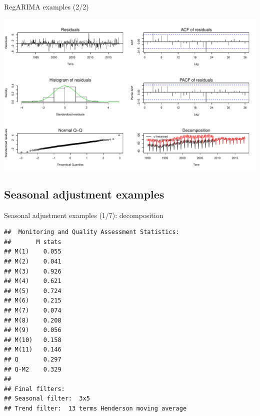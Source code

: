 \documentclass[10pt,xcolor=table,color={dvipsnames,usenames},ignorenonframetext,usepdftitle=false,french]{beamer}
\newenvironment{Shaded}{\begin{snugshade}}{\end{snugshade}}
\newcommand{\DataTypeTok}[1]{\textcolor[rgb]{0.13,0.29,0.53}{#1}}
\newcommand{\DecValTok}[1]{\textcolor[rgb]{0.00,0.00,0.81}{#1}}
\newcommand{\KeywordTok}[1]{\textcolor[rgb]{0.13,0.29,0.53}{\textbf{#1}}}
\newcommand{\NormalTok}[1]{#1}
\newcommand{\OperatorTok}[1]{\textcolor[rgb]{0.81,0.36,0.00}{\textbf{#1}}}
\newcommand{\OtherTok}[1]{\textcolor[rgb]{0.56,0.35,0.01}{#1}}
\begin{document}
\begin{frame}[fragile]{RegARIMA examples (2/2)}
\protect\hypertarget{regarima-examples-22}{}

\begin{Shaded}
\end{Shaded}

\includegraphics{img/markdown-unnamed-chunk-5-1.pdf}

\end{frame}

\hypertarget{seasonal-adjustment-examples}{%
\subsection{Seasonal adjustment
examples}\label{seasonal-adjustment-examples}}

\begin{frame}[fragile]{Seasonal adjustment examples (1/7):
decomposition}
\protect\hypertarget{seasonal-adjustment-examples-17-decomposition}{}

\footnotesize

\begin{Shaded}
\end{Shaded}

\begin{verbatim}
##  Monitoring and Quality Assessment Statistics:  
##       M stats
## M(1)    0.055
## M(2)    0.041
## M(3)    0.926
## M(4)    0.621
## M(5)    0.724
## M(6)    0.215
## M(7)    0.074
## M(8)    0.208
## M(9)    0.056
## M(10)   0.158
## M(11)   0.146
## Q       0.297
## Q-M2    0.329
## 
## Final filters: 
## Seasonal filter:  3x5
## Trend filter:  13 terms Henderson moving average
\end{verbatim}

\end{frame}
\end{document}
